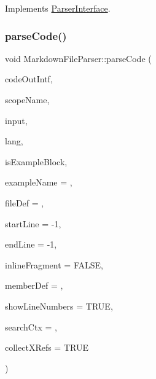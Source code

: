 Implements \mbox{\hyperlink{class_parser_interface_a36c669b17b64a6e3847f27d70a5398d2}{Parser\+Interface}}.

\mbox{\label{class_markdown_file_parser_a4413366ce7b6f7e41a2b232ce2ad6170}} 
\subsubsection{\texorpdfstring{parseCode()}{parseCode()}}
{\footnotesize\ttfamily void Markdown\+File\+Parser\+::parse\+Code (\begin{DoxyParamCaption}\item[{\mbox{\hyperlink{class_code_output_interface}{Code\+Output\+Interface}} \&}]{code\+Out\+Intf,  }\item[{const char $\ast$}]{scope\+Name,  }\item[{const \mbox{\hyperlink{class_q_c_string}{Q\+C\+String}} \&}]{input,  }\item[{\mbox{\hyperlink{types_8h_a9974623ce72fc23df5d64426b9178bf2}{Src\+Lang\+Ext}}}]{lang,  }\item[{bool}]{is\+Example\+Block,  }\item[{const char $\ast$}]{example\+Name = {},  }\item[{\mbox{\hyperlink{class_file_def}{File\+Def}} $\ast$}]{file\+Def = {},  }\item[{int}]{start\+Line = {\ttfamily -\/1},  }\item[{int}]{end\+Line = {\ttfamily -\/1},  }\item[{bool}]{inline\+Fragment = {\ttfamily FALSE},  }\item[{\mbox{\hyperlink{class_member_def}{Member\+Def}} $\ast$}]{member\+Def = {},  }\item[{bool}]{show\+Line\+Numbers = {\ttfamily TRUE},  }\item[{\mbox{\hyperlink{class_definition}{Definition}} $\ast$}]{search\+Ctx = {},  }\item[{bool}]{collect\+X\+Refs = {\ttfamily TRUE} }\end{DoxyParamCaption})\hspace{0.3cm}{\ttfamily [virtual]}}

